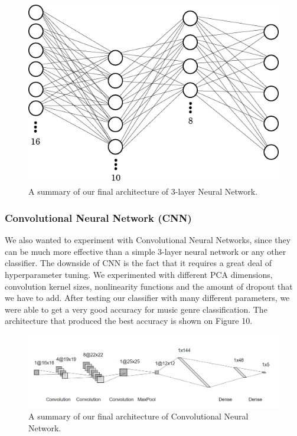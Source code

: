 \begin{figure}
\begin{center}
\includegraphics[scale=0.2]{./figures/arch_nn.png}
\end{center}
\caption
{
A summary of our final architecture of 3-layer Neural Network.
}
\label{fig:big_picture1}
\end{figure}


\subsubsection{\textbf{Convolutional Neural Network (CNN)}}
We also wanted to experiment with Convolutional Neural Networks, since they can be much more effective than a simple 3-layer neural network or any other classifier. The downside of CNN is the fact that it requires a great deal of hyperparameter tuning. We experimented with different PCA dimensions, convolution kernel sizes, nonlinearity functions and the amount of dropout that we have to add. After testing our classifier with many different parameters, we were able to get a very good accuracy for music genre classification. The architecture that produced the best accuracy is shown on Figure 10. 
\begin{figure}
\begin{center}
\includegraphics[scale=0.2]{./figures/arch_cnn.png}
\end{center}
\caption
{
A summary of our final architecture of Convolutional Neural Network.
}
\label{fig:big_picture1}
\end{figure}


